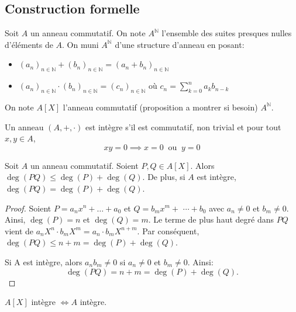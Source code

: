 \subsection{Construction formelle}

\begin{definition}

	Soit $A$ un anneau commutatif. On note $A^{\mathbb{N}}$ l'ensemble des suites presques nulles d'éléments de $A$.
	On muni $A^{\mathbb{N}}$ d'une structure d'anneau en posant:
	\begin{itemize}
		\item $(a_n)_{n \in \mathbb{N}} + (b_n)_{n \in \mathbb{N}} = (a_n + b_n)_{n \in \mathbb{N}}$
		\item $(a_n)_{n \in \mathbb{N}} \cdot (b_n)_{n \in \mathbb{N}} = (c_n)_{n \in \mathbb{N}}$ où $c_n = \sum_{k=0}^{n} a_k b_{n-k}$
	\end{itemize}

	On note $A[X]$ l'anneau commutatif (proposition a montrer si besoin)  $A^{\mathbb{N}}$.

\end{definition}

\begin{definition}
	Un anneau $(A, +, \cdot)$ est intègre s'il est commutatif, non trivial et pour tout $x, y \in A$,
	\begin{equation*}
		xy = 0 \implies x = 0 \ \text{ ou } \ y = 0
	\end{equation*}
\end{definition}

\begin{prop}
	Soit $A$ un anneau commutatif.
	Soient $P, Q \in A[X]$. Alors $\deg(PQ) \leq \deg(P) + \deg(Q)$.
	De plus, si $A$ est intègre, $\deg(PQ) = \deg(P) + \deg(Q)$.
\end{prop}

\begin{proof}
	Soient $P=a_n x^n+\ldots+a_0$ et $Q=b_m x^m+$ $\cdots+b_0$ avec $a_n \neq 0$ et $b_m \neq 0$.
	Ainsi, $\deg(P)=n$ et $\deg(Q)=m$. Le terme de plus haut degré dans $P Q$ vient de $a_n X^n \cdot b_m X^m=a_n \cdot b_m X^{n+m}$.
	Par conséquent, $\deg(P Q) \leq n+m=\deg(P)+\deg(Q)$.

	Si A est intègre, alors $a_n b_m \neq 0$ si $a_n \neq 0$ et $b_m \neq 0$. Ainsi:
	$$
		\deg(P Q)=n+m=\deg(P)+\deg(Q).
	$$
\end{proof}

\begin{coro}
	$A[X]$ intègre $\iff A$ intègre.
\end{coro}

